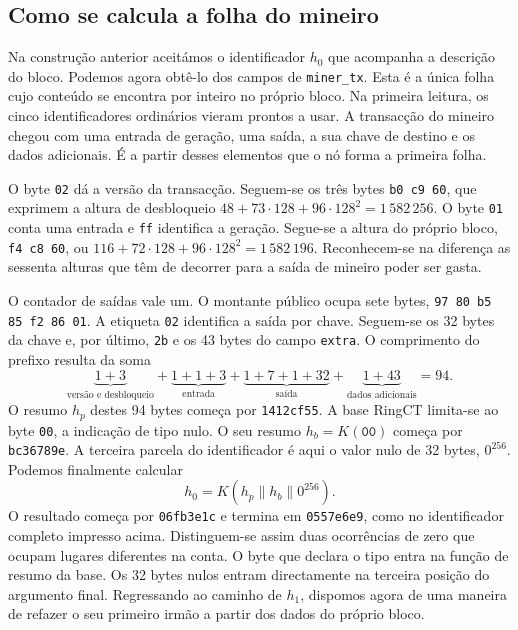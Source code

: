 \subsection{Como se calcula a folha do mineiro}

Na construção anterior aceitámos o identificador \(h_0\) que acompanha
a descrição do bloco. Podemos agora obtê-lo dos campos de
\texttt{miner\_tx}. Esta é a única folha cujo conteúdo se encontra
por inteiro no próprio bloco. Na primeira leitura, os cinco
identificadores ordinários vieram prontos a usar. A transacção do
mineiro chegou com uma entrada de geração, uma saída, a sua chave
de destino e os dados adicionais. É a partir desses elementos que o
nó forma a primeira folha.

O byte \texttt{02} dá a versão da transacção. Seguem-se os três bytes
\texttt{b0 c9 60}, que exprimem a altura de desbloqueio
\(48+73\cdot128+96\cdot128^2=1\,582\,256\).
O byte \texttt{01} conta uma entrada e \texttt{ff} identifica a
geração. Segue-se a altura do próprio bloco, \texttt{f4 c8 60},
ou \(116+72\cdot128+96\cdot128^2=1\,582\,196\).
Reconhecem-se na diferença as sessenta alturas que têm de decorrer
para a saída de mineiro poder ser gasta.

O contador de saídas vale um. O montante público ocupa sete bytes,
\texttt{97 80 b5 85 f2 86 01}. A etiqueta \texttt{02} identifica
a saída por chave. Seguem-se os 32 bytes da chave e, por último,
\texttt{2b} e os 43 bytes do campo \texttt{extra}. O comprimento
do prefixo resulta da soma
\[
 \underbrace{1+3}_{\text{versão e desbloqueio}}+
 \underbrace{1+1+3}_{\text{entrada}}+
 \underbrace{1+7+1+32}_{\text{saída}}+
 \underbrace{1+43}_{\text{dados adicionais}}=94 .
\]
O resumo \(h_p\) destes 94 bytes começa por \texttt{1412cf55}.
A base RingCT limita-se ao byte \texttt{00}, a indicação de tipo
nulo. O seu resumo \(h_b=K(\mathtt{00})\) começa por
\texttt{bc36789e}. A terceira parcela do identificador é aqui o
valor nulo de 32 bytes, \(0^{256}\). Podemos finalmente calcular
\[
                   h_0=K(h_p\|h_b\|0^{256}).
\]
O resultado começa por \texttt{06fb3e1c} e termina em
\texttt{0557e6e9}, como no identificador completo impresso acima.
Distinguem-se assim duas ocorrências de zero que ocupam lugares
diferentes na conta. O byte que declara o tipo entra na função
de resumo da base. Os 32 bytes nulos entram directamente na terceira
posição do argumento final. Regressando ao caminho de \(h_1\),
dispomos agora de uma maneira de refazer o seu primeiro irmão a
partir dos dados do próprio bloco.


